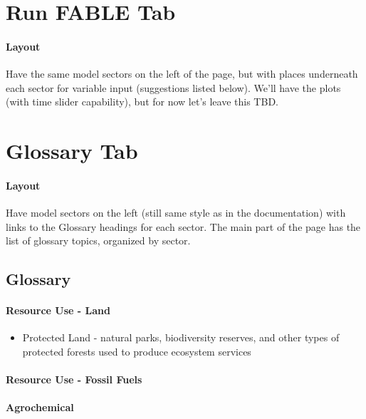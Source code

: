 \documentclass[10pt]{article}
\begin{document}

\section{Run FABLE Tab}
\paragraph{Layout}
Have the same model sectors on the left of the page, but with places underneath each sector for variable input (suggestions listed below). We'll have the plots (with time slider capability), but for now let's leave this TBD. 



\section{Glossary Tab}
\paragraph{Layout}
Have model sectors on the left (still same style as in the documentation) with links to the Glossary headings for each sector. The main part of the page has the list of glossary topics, organized by sector. 

\subsection{Glossary}
\paragraph{Resource Use - Land}
\begin{itemize}
\item Protected Land - natural parks, biodiversity reserves, and other types of protected forests used to produce ecosystem services
\end{itemize}
\paragraph{Resource Use - Fossil Fuels}
\paragraph{Agrochemical}
\end{document}
